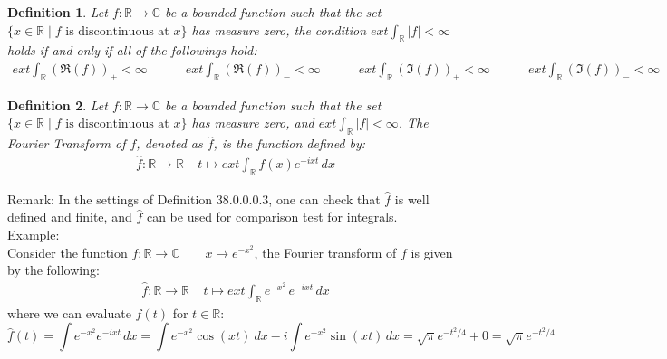 \documentclass[11pt,oneside]{book}
\theoremstyle{break}
\theoremstyle{break}
\newtheorem{defn}{Definition}[corL]
\newcommand{\R}{\mathbb{R}}
\newcommand{\Complex}{\mathbb{C}}
\newcommand{\remark}{\color{blue}Remark: \color{black}}
\newcommand{\example}{\color{green}Example: \color{black}}
\begin{document}
\begin{defn}
Let $f:\R \to \Complex$ be a bounded function such that the set $\{x \in \R \mid f\text{ is discontinuous at }x\}$ has measure zero, the condition $ext \int_{\R}|f| < \infty$ holds if and only if all of the followings hold:
\begin{align*}
ext\int_{\R}(\Re(f))_+ < \infty \quad \qquad ext\int_{\R}(\Re(f))_- < \infty\qquad\quad ext\int_{\R}(\Im(f))_+ < \infty\quad\qquad ext\int_{\R}(\Im(f))_- < \infty
\end{align*}
\end{defn}

\begin{defn}
Let $f:\R \to \Complex$ be a bounded function such that the set $\{x \in \R \mid f\text{ is discontinuous at }x\}$ has measure zero, and $ext \int_{\R}|f| < \infty$. The Fourier Transform of $f$, denoted as $\hat{f}$, is the function defined by: 
\begin{align*}
\hat{f}:\R \to \R \ \ \ \ \ t\mapsto ext\int_{\R}f(x) e^{-i xt}\, dx
\end{align*}
\end{defn}

\remark In the settings of Definition 38.0.0.0.3, one can check that $\hat{f}$ is well defined and finite, and $\hat{f}$ can be used for comparison test for integrals.\\

\example\\
Consider the function $f:\R \to \Complex\qquad x\mapsto e^{-x^2}$, the Fourier transform of $f$ is given by the following:
\begin{align*}
\hat{f}:\R \to \R \ \ \ \ \ t\mapsto ext\int_{\R}e^{-x^2}\, e^{-i xt}\, dx
\end{align*}
where we can evaluate $\hat{f}(t)$ for $t \in \R$:
$$\hat{f}(t) = \int e^{-x^2}e^{-ixt}\, dx = \int e^{-x^2}\cos(xt)\ dx  - i \int e^{-x^2} \sin(xt)\, dx = \sqrt{\pi} e^{-t^2/4} + 0 =\sqrt{\pi} e^{-t^2/4}$$
\hfill\break
\newpage
\end{document}
